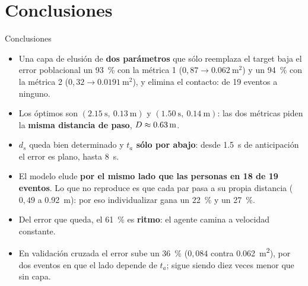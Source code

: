 \documentclass[aspectratio=169,11pt]{beamer}
\begin{document}
\section{Conclusiones}

\begin{frame}{Conclusiones}
    \vspace{0.1em}
    \small
    \begin{itemize}\setlength{\itemsep}{0.55em}
        \item Una capa de elusión de \textbf{dos parámetros} que sólo reemplaza el
              target baja el error poblacional un \SI{93}{\percent} con la métrica
              1 ($0{,}87 \to \SI{0.062}{\meter\squared}$) y un \SI{94}{\percent} con
              la métrica 2 ($0{,}32 \to \SI{0.0191}{\meter\squared}$), y elimina el
              contacto: de 19 eventos a ninguno.
        \item Los óptimos son $(\SI{2.15}{\second},\ \SI{0.13}{\meter})$ y
              $(\SI{1.50}{\second},\ \SI{0.14}{\meter})$: las dos métricas piden la
              \textbf{misma distancia de paso}, $D \approx \SI{0.63}{\meter}$.
        \item $d_s$ queda bien determinado y \textbf{$t_a$ sólo por abajo}: desde
              \SI{1.5}{\second} de anticipación el error es plano, hasta
              \SI{8}{\second}.
        \item El modelo elude \textbf{por el mismo lado que las personas en 18 de
              19 eventos}. Lo que no reproduce es que cada par pasa a su propia
              distancia ($0{,}49$ a \SI{0.92}{\meter}): por eso individualizar
              gana un \SI{22}{\percent} y un \SI{27}{\percent}.
        \item Del error que queda, el \SI{61}{\percent} es \textbf{ritmo}: el
              agente camina a velocidad constante.
        \item En validación cruzada el error sube un \SI{36}{\percent}
              ($0{,}084$ contra \SI{0.062}{\meter\squared}), por dos eventos en que
              el lado depende de $t_a$; sigue siendo diez veces menor que sin capa.
    \end{itemize}
\end{frame}
\end{document}
